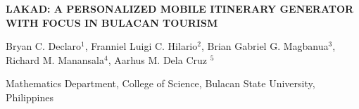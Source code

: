 \documentclass[11pt]{article}
\begin{document}
\onehalfspacing

\begin{titlepage}
	\centering
	\vspace*{1cm}

	{\centering\large\bfseries\MakeUppercase{
			Lakad: A Personalized Mobile Itinerary Generator with Focus in Bulacan Tourism
	}}

	\vspace{10pt}

	{\centering Bryan C. Declaro$^{1}$, Franniel Luigi C. Hilario$^{2}$, Brian Gabriel G. Magbanua$^{3}$, Richard M. Manansala$^{4}$, Aarhus M. Dela Cruz $^{5}$}

	\vspace{10pt}

	{
		Mathematics Department, College of Science, Bulacan State University, Philippines
	}


	\vspace{20pt}

 \begin{justify}
		
	\end{justify}

\end{titlepage}





% 


% 


\newpage
\printbibliography[heading=bibintoc, title={REFERENCES}]
\end{document}
